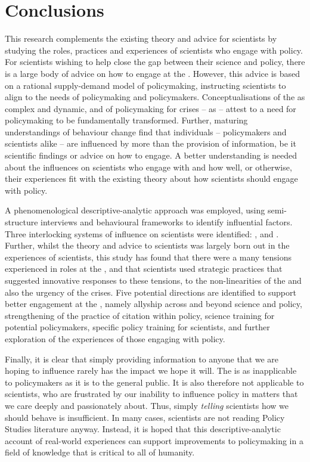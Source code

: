 \chapter{Conclusions}\label{ch:conclusions}

This research complements the existing theory and advice for scientists by studying the roles, practices and experiences of scientists who engage with policy. For \CAN{} scientists wishing to help close the gap between their science and \CAN{} policy, there is a large body of advice on how to engage at the \SPI. However, this advice is based on a rational supply-demand model of policymaking, instructing scientists to align to the needs of policymaking and policymakers. Conceptualisations of the \SPI{} as complex and dynamic, and of policymaking for \CAN{} crises -- as \PNS{} -- attest to a need for \CAN{} policymaking to be fundamentally transformed. Further, maturing understandings of behaviour change find that individuals -- policymakers and scientists alike -- are influenced by more than the provision of information, be it scientific findings or advice on how to engage. A better understanding is needed about the influences on scientists who engage with \CAN{} \SPI and how well, or otherwise, their experiences fit with the existing theory about how scientists should engage with policy.

A phenomenological descriptive-analytic approach was employed, using semi-structure interviews and behavioural frameworks to identify influential factors. Three interlocking systems of influence on scientists were identified: \skiinte, \skiknow{} and \skiscip. Further, whilst the theory and advice to scientists was largely born out in the experiences of scientists, this study has found that there were a many tensions experienced in roles at the \SPI, and that scientists used strategic practices that suggested innovative responses to these tensions, to the non-linearities of the \SPI{} and also the urgency of the \CAN{} crises. Five potential directions are identified to support better engagement at the \CAN{} \SPI, namely allyship across and beyond \CAN{} science and policy, strengthening of the practice of citation within policy, science training for potential policymakers, specific policy training for scientists, and further exploration of the experiences of those engaging with policy. 

Finally, it is clear that simply providing information to anyone that we are hoping to influence rarely has the impact we hope it will. The \IDM{} is as inapplicable to policymakers as it is to the general public. It is also therefore not applicable to scientists, who are frustrated by our inability to influence policy in matters that we care deeply and passionately about. Thus, simply \emph{telling} scientists how we should behave is insufficient. In many cases, scientists are not reading Policy Studies literature anyway. Instead, it is hoped that this descriptive-analytic account of real-world experiences can support improvements to policymaking in a field of knowledge that is critical to all of humanity. 